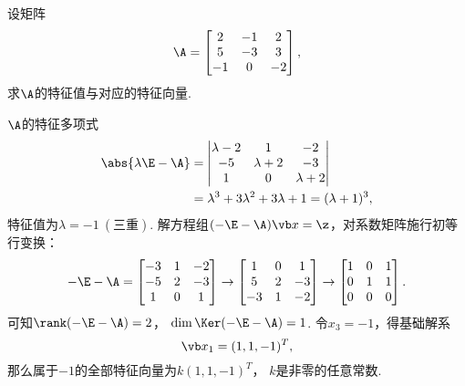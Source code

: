 \begin{example}
设矩阵\[
	\A = \begin{bmatrix}
		2 & -1 & 2 \\
		5 & -3 & 3 \\
		-1 & 0 & -2
	\end{bmatrix},
\]
求\(\A\)的特征值与对应的特征向量.
\begin{solution}
\(\A\)的特征多项式\begin{align*}
	\abs{\lambda\E-\A}
	&= \begin{vmatrix}
		\lambda-2 & 1 & -2 \\
		-5 & \lambda+2 & -3 \\
		1 & 0 & \lambda+2
	\end{vmatrix} \\
	&= \lambda^3 + 3\lambda^2 + 3\lambda + 1
	= (\lambda+1)^3,
\end{align*}
特征值为\(\lambda=-1\ (\text{三重})\).
解方程组\((-\E-\A)\x = \z\)，对系数矩阵施行初等行变换：\[
	-\E-\A = \begin{bmatrix}
		-3 & 1 & -2 \\
		-5 & 2 & -3 \\
		1 & 0 & 1
	\end{bmatrix} \to \begin{bmatrix}
		1 & 0 & 1 \\
		5 & 2 & -3 \\
		-3 & 1 & -2
	\end{bmatrix} \to \begin{bmatrix}
		1 & 0 & 1 \\
		0 & 1 & 1 \\
		0 & 0 & 0
	\end{bmatrix}.
\]
可知\(\rank(-\E-\A) = 2\)，
\(\dim\Ker(-\E-\A) = 1\).
令\(x_3 = -1\)，得基础解系\[
	\x_1 = (1,1,-1)^T,
\]
那么属于\(-1\)的全部特征向量为\(k (1,1,-1)^T\)，
\(k\)是非零的任意常数.
\end{solution}
\end{example}

